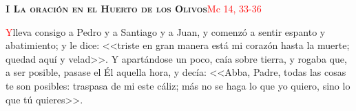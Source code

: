 \noindent\textbf{\textsc{I La oración en el Huerto de los Olivos}}\hfill\textcolor{red}{Mc 14, 33-36}

\vspace{0.25em}

\lettrine[lines=2]{\textcolor{red}{Y}}\space lleva consigo a Pedro y a Santiago y a Juan, y comenzó a sentir espanto y abatimiento; y le dice: <<triste en gran manera está mi corazón hasta la muerte;
quedad aquí y velad>>. Y apartándose un poco, caía sobre tierra, y rogaba que, a ser posible, pasase el Él aquella hora, y decía: <<Abba, Padre, todas las cosas te son posibles:
traspasa de mi este cáliz; más no se haga lo que yo quiero, sino lo que tú quieres>>.